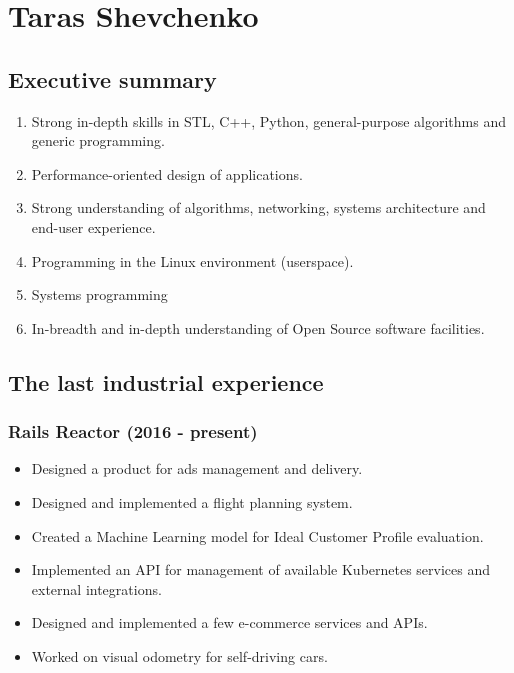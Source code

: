 \documentclass[a4paper,12pt,final]{extreport}
\begin{document}
\section{Taras Shevchenko}
\subsection{Executive summary}
\begin{enumerate}
  \item Strong in-depth skills in STL, C++, Python, general-purpose algorithms and generic programming.
  \item Performance-oriented design of applications.
  \item Strong understanding of algorithms, networking, systems architecture and end-user experience.
  \item Programming in the Linux environment (userspace).
  \item Systems programming
  \item In-breadth and in-depth understanding of Open Source software facilities.
\end{enumerate}

\subsection{The last industrial experience}
\subsubsection{Rails Reactor (2016 - present)}
\begin{itemize}
  \item Designed a product for ads management and delivery.
  \item Designed and implemented a flight planning system.
  \item Created a Machine Learning model for Ideal Customer Profile evaluation.
  \item Implemented an API for management of available Kubernetes services and external integrations.
  \item Designed and implemented a few e-commerce services and APIs.
  \item Worked on visual odometry for self-driving cars.  
\end{itemize}
\end{document}

